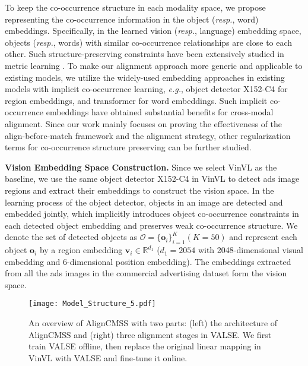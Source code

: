 \documentclass[letterpaper]{article} \usepackage{aaai24}  \usepackage{times}  \usepackage{helvet}  \usepackage{courier}  \usepackage[hyphens]{url}  \usepackage{graphicx} \urlstyle{rm} \def\UrlFont{\rm}  \usepackage{natbib}  \usepackage{caption} \frenchspacing  \setlength{\pdfpagewidth}{8.5in}  \setlength{\pdfpageheight}{11in}
\begin{document}
To keep the co-occurrence structure in each modality space, we propose representing the co-occurrence information in the object (\textit{resp.}, word) embeddings. Specifically, in the learned vision (\textit{resp.}, language) embedding space, objects (\textit{resp.}, words) with similar co-occurrence relationships are close to each other. Such structure-preserving constraints have been extensively studied in metric learning \cite{Wang_2016_CVPR, liu2021semantic}. To make our alignment approach more generic and applicable to existing models, we utilize the widely-used embedding approaches in existing models with implicit co-occurrence learning, \textit{e.g.}, object detector X152-C4 for region embeddings, and transformer for word embeddings. Such implicit co-occurrence embeddings have obtained substantial benefits for cross-modal alignment. Since our work mainly focuses on proving the effectiveness of the align-before-match framework and the alignment strategy, other regularization terms for co-occurrence structure preserving can be further studied.      

\noindent\textbf{Vision Embedding Space Construction.} Since we select VinVL as the baseline, we use the same object detector X152-C4 \cite{zhang2021vinvl} in VinVL to detect ads image regions and extract their embeddings to construct the vision space. In the learning process of the object detector, objects in an image are detected and embedded jointly, which implicitly introduces object co-occurrence constraints in each detected object embedding and preserves weak co-occurrence structure.  We denote the set of detected objects as $\mathcal{O} = \{{\boldsymbol{o}_i}\}_{i=1}^K (K=50)$ and represent each object $\boldsymbol{o}_i$  by a region embedding $\boldsymbol{v}_i\in{\mathbb{R}^{d_1}}$  ($d_1= 2054$ with 2048-dimensional visual embedding and 6-dimensional position embedding). The embeddings extracted from all the ads images in the commercial advertising dataset \cite{10.1145/3503161.3548226} form the vision space. 

\begin{figure*}
    \centering
    \vspace{5pt}
    \texttt{[image: Model\_Structure\_5.pdf]}   
    \caption{An overview of AlignCMSS with two parts: (left) the architecture of AlignCMSS and (right) three alignment stages in VALSE. We first train VALSE offline, then replace the original linear mapping in VinVL with VALSE and fine-tune it online. }
 \vspace{-10pt}
    \label{fig:model-architecture}
\end{figure*}
\end{document}
